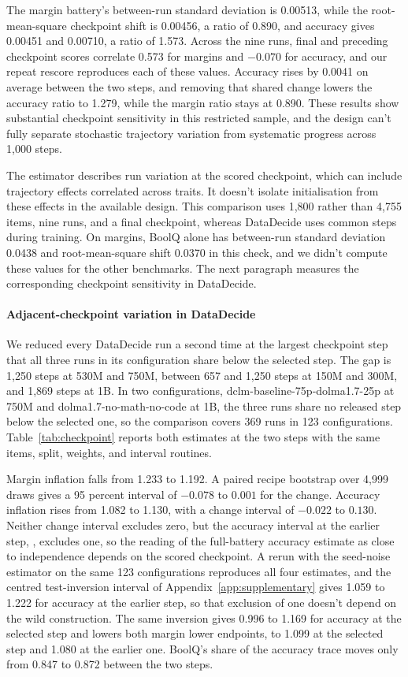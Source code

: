 The margin battery's between-run standard deviation is 0.00513, while the root-mean-square checkpoint shift is 0.00456, a ratio of 0.890, and accuracy gives 0.00451 and 0.00710, a ratio of 1.573. Across the nine runs, final and preceding checkpoint scores correlate 0.573 for margins and $-0.070$ for accuracy, and our repeat rescore reproduces each of these values. Accuracy rises by 0.0041 on average between the two steps, and removing that shared change lowers the accuracy ratio to 1.279, while the margin ratio stays at 0.890. These results show substantial checkpoint sensitivity in this restricted sample, and the design can't fully separate stochastic trajectory variation from systematic progress across 1,000 steps.

The estimator describes run variation at the scored checkpoint, which can include trajectory effects correlated across traits. It doesn't isolate initialisation from these effects in the available design. This comparison uses 1,800 rather than 4,755 items, nine runs, and a final checkpoint, whereas DataDecide uses common steps during training. On margins, BoolQ alone has between-run standard deviation 0.0438 and root-mean-square shift 0.0370 in this check, and we didn't compute these values for the other benchmarks. The next paragraph measures the corresponding checkpoint sensitivity in DataDecide.

\paragraph{Adjacent-checkpoint variation in DataDecide}
\label{app:checkpoint}
We reduced every DataDecide run a second time at the largest checkpoint step that all three runs in its configuration share below the selected step. The gap is 1,250 steps at 530M and 750M, between 657 and 1,250 steps at 150M and 300M, and 1,869 steps at 1B. In two configurations, dclm-baseline-75p-dolma1.7-25p at 750M and dolma1.7-no-math-no-code at 1B, the three runs share no released step below the selected one, so the comparison covers 369 runs in 123 configurations. Table~\ref{tab:checkpoint} reports both estimates at the two steps with the same items, split, weights, and interval routines.

Margin inflation falls from 1.233 to 1.192. A paired recipe bootstrap over 4,999 draws gives a 95 percent interval of $-0.078$ to $0.001$ for the change. Accuracy inflation rises from 1.082 to 1.130, with a change interval of $-0.022$ to $0.130$. Neither change interval excludes zero, but the accuracy interval at the earlier step, , excludes one, so the reading of the full-battery accuracy estimate as close to independence depends on the scored checkpoint. A rerun with the seed-noise estimator on the same 123 configurations reproduces all four estimates, and the centred test-inversion interval of Appendix~\ref{app:supplementary} gives 1.059 to 1.222 for accuracy at the earlier step, so that exclusion of one doesn't depend on the wild construction. The same inversion gives 0.996 to 1.169 for accuracy at the selected step and lowers both margin lower endpoints, to 1.099 at the selected step and 1.080 at the earlier one. BoolQ's share of the accuracy trace moves only from 0.847 to 0.872 between the two steps.

